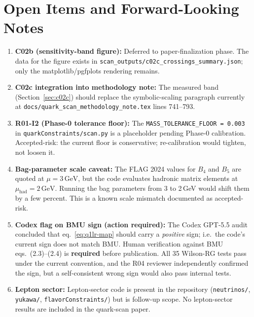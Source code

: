 \documentclass[11pt]{article}
\begin{document}
\section{Open Items and Forward-Looking Notes}
\label{sec:open}

\begin{enumerate}
  \item \textbf{C02b (sensitivity-band figure):} Deferred to
    paper-finalization phase.  The data for the figure exists in
    \texttt{scan\_outputs/c02c\_crossings\_summary.json}; only the
    matplotlib/pgfplots rendering remains.

  \item \textbf{C02c integration into methodology note:} The
    measured band (Section~\ref{sec:c02c}) should replace the
    symbolic-scaling paragraph currently at
    \texttt{docs/quark\_scan\_methodology\_note.tex} lines 741--793.

  \item \textbf{R01-I2 (Phase-0 tolerance floor):} The
    \texttt{MASS\_TOLERANCE\_FLOOR = 0.003} in
    \texttt{quarkConstraints/scan.py} is a placeholder pending
    Phase-0 calibration.  Accepted-risk: the current floor is
    conservative; re-calibration would tighten, not loosen it.

  \item \textbf{Bag-parameter scale caveat:} The FLAG 2024 values for
    $B_4$ and $B_5$ are quoted at $\mu = 3\,\mathrm{GeV}$, but the
    code evaluates hadronic matrix elements at
    $\mu_{\mathrm{had}} = 2\,\mathrm{GeV}$.  Running the bag
    parameters from 3 to 2\,GeV would shift them by a few percent.
    This is a known scale mismatch documented as accepted-risk.

  \item \textbf{Codex flag on BMU sign (\textbf{action required}):}
    The Codex GPT-5.5 audit concluded that
    eq.~\eqref{eq:q1lr-map} should carry a \emph{positive} sign;
    i.e.\ the code's current sign does not match BMU.  Human
    verification against BMU eqs.~(2.3)--(2.4) is \textbf{required}
    before publication.  All 35 Wilson-RG tests pass under the current
    convention, and the R04 reviewer independently confirmed the sign,
    but a self-consistent wrong sign would also pass internal tests.

  \item \textbf{Lepton sector:} Lepton-sector code is present in the
    repository (\texttt{neutrinos/}, \texttt{yukawa/},
    \texttt{flavorConstraints/}) but is follow-up scope.  No
    lepton-sector results are included in the quark-scan paper.


\end{enumerate}
\end{document}
